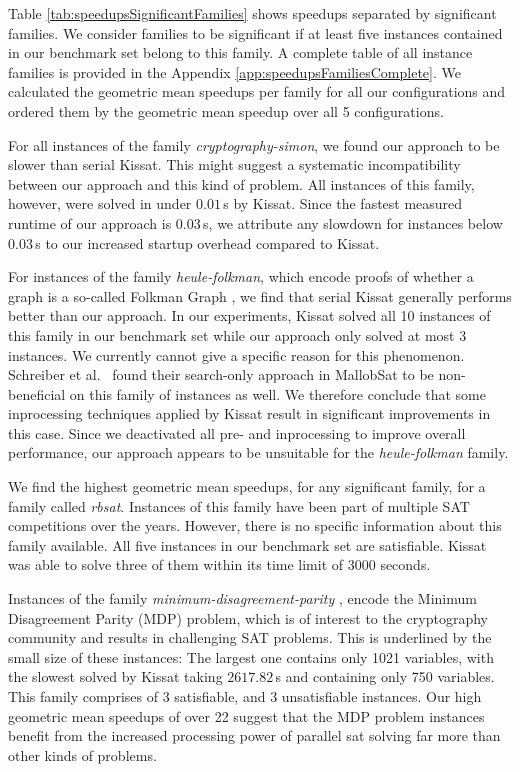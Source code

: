 \documentclass[12pt,a4paper,twoside]{scrartcl}
\numberwithin{equation}{section}
\begin{document}
Table \ref{tab:speedupsSignificantFamilies} shows speedups separated by significant families. We consider families to be significant if at least five instances contained in our benchmark set belong to this family. A complete table of all instance families is provided in the Appendix \ref{app:speedupsFamiliesComplete}. We calculated the geometric mean speedups per family for all our configurations and ordered them by the geometric mean speedup over all 5 configurations.

For all instances of the family \textit{cryptography-simon}, we found our approach to be slower than serial Kissat. This might suggest a systematic incompatibility between our approach and this kind of problem. All instances of this family, however, were solved in under $0.01\,$s by Kissat. Since the fastest measured runtime of our approach is $0.03\,$s, we attribute any slowdown for instances below $0.03\,$s to our increased startup overhead compared to Kissat.

For instances of the family \textit{heule-folkman}, which encode proofs of whether a graph is a so-called Folkman Graph \cite{satComp2024}, we find that serial Kissat generally performs better than our approach. In our experiments, Kissat solved all 10 instances of this family in our benchmark set while our approach only solved at most 3 instances. We currently cannot give a specific reason for this phenomenon. Schreiber et al.~\cite{searchOnlyPaper} found their search-only approach in MallobSat to be non-beneficial on this family of instances as well. We therefore conclude that some inprocessing techniques applied by Kissat result in significant improvements in this case. Since we deactivated all pre- and inprocessing to improve overall performance, our approach appears to be unsuitable for the \textit{heule-folkman} family.

We find the highest geometric mean speedups, for any significant family, for a family called \textit{rbsat}. Instances of this family have been part of multiple SAT competitions over the years. However, there is no specific information about this family available. All five instances in our benchmark set are satisfiable. Kissat was able to solve three of them within its time limit of 3000 seconds.

Instances of the family \textit{minimum-disagreement-parity} \cite{satComp2022}, encode the Minimum Disagreement Parity (MDP) problem, which is of interest to the cryptography community and results in challenging SAT problems. This is underlined by the small size of these instances: The largest one contains only 1021 variables, with the slowest solved by Kissat taking $2617.82\,$s and containing only 750 variables. This family comprises of 3 satisfiable, and 3 unsatisfiable instances. Our high geometric mean speedups of over 22 suggest that the MDP problem instances benefit from the increased processing power of parallel sat solving far more than other kinds of problems.
\end{document}
